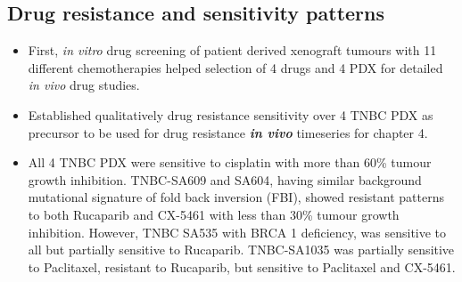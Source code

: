  \subsection{Drug resistance and sensitivity patterns}
\begin{itemize} 
     \item First, \textit{in vitro} drug screening of patient derived xenograft tumours with 11 different chemotherapies helped selection of 4 drugs and 4 PDX  for detailed \textit{in vivo} drug studies.
     
   \item  Established qualitatively drug resistance sensitivity over 4 TNBC PDX as precursor to be used for drug resistance \textbf{\textit{in vivo}} timeseries for chapter 4.
   
 \item All 4 TNBC PDX were sensitive to cisplatin with more than 60\% tumour growth inhibition. TNBC-SA609 and SA604, having similar background mutational signature of fold back inversion (FBI), showed resistant patterns to both Rucaparib and CX-5461 with less than 30\% tumour growth inhibition. However, TNBC SA535 with BRCA 1 deficiency, was sensitive to all but partially sensitive to Rucaparib. TNBC-SA1035 was partially sensitive to Paclitaxel, resistant to Rucaparib, but sensitive to Paclitaxel and CX-5461.

\end{itemize}

